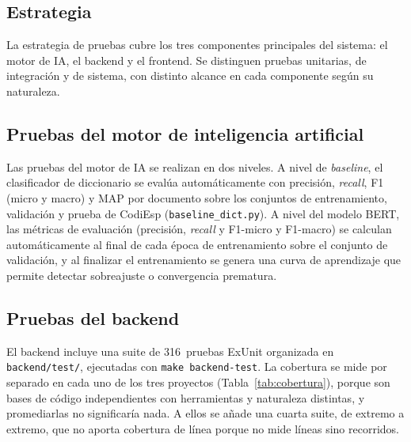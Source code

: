 \subsection{Estrategia}

La estrategia de pruebas cubre los tres componentes principales del sistema: el motor de IA, el backend y el frontend. Se distinguen pruebas unitarias, de integración y de sistema, con distinto alcance en cada componente según su naturaleza.

\subsection{Pruebas del motor de inteligencia artificial}

Las pruebas del motor de IA se realizan en dos niveles. A nivel de \emph{baseline}, el clasificador de diccionario se evalúa automáticamente con precisión, \emph{recall}, F1 (micro y macro) y MAP por documento sobre los conjuntos de entrenamiento, validación y prueba de CodiEsp (\texttt{baseline\_dict.py}). A nivel del modelo BERT, las métricas de evaluación (precisión, \emph{recall} y F1-micro y F1-macro) se calculan automáticamente al final de cada época de entrenamiento sobre el conjunto de validación, y al finalizar el entrenamiento se genera una curva de aprendizaje que permite detectar sobreajuste o convergencia prematura.

\subsection{Pruebas del backend}
\label{sec:pruebas-backend}

El backend incluye una suite de 316~pruebas ExUnit organizada en \texttt{backend/test/}, ejecutadas con \texttt{make backend-test}. La cobertura se mide por separado en cada uno de los tres proyectos (Tabla~\ref{tab:cobertura}), porque son bases de código independientes con herramientas y naturaleza distintas, y promediarlas no significaría nada. A ellos se añade una cuarta suite, de extremo a extremo, que no aporta cobertura de línea porque no mide líneas sino recorridos.


